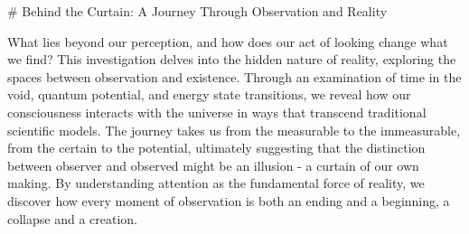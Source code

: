 # Behind the Curtain: A Journey Through Observation and Reality

What lies beyond our perception, and how does our act of looking change what we find? This investigation delves into the hidden nature of reality, exploring the spaces between observation and existence. Through an examination of time in the void, quantum potential, and energy state transitions, we reveal how our consciousness interacts with the universe in ways that transcend traditional scientific models. The journey takes us from the measurable to the immeasurable, from the certain to the potential, ultimately suggesting that the distinction between observer and observed might be an illusion - a curtain of our own making. By understanding attention as the fundamental force of reality, we discover how every moment of observation is both an ending and a beginning, a collapse and a creation.